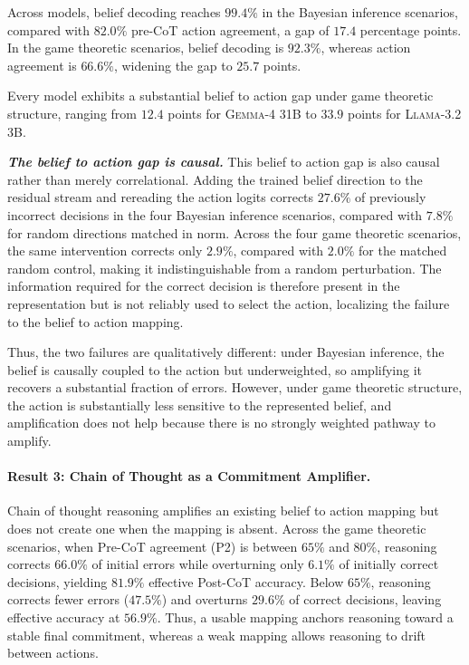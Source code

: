 \documentclass[letterpaper]{article} %
\newcommand{\model}[1]{\textsc{#1}}
\begin{document}
Across models, belief decoding reaches \(99.4\%\) in the Bayesian inference
scenarios, compared with \(82.0\%\) pre-CoT action agreement, a gap of
\(17.4\) percentage points. In the game theoretic scenarios, belief decoding
is \(92.3\%\), whereas action agreement is \(66.6\%\), widening the gap to
\(25.7\) points.

Every model exhibits a substantial belief to action gap under game
theoretic structure, ranging from \(12.4\) points for
\model{Gemma-4} 31B to \(33.9\) points for \model{Llama-3.2} 3B.



\textbf{\textit{The belief to action gap is causal.}}
This belief to action gap is also causal rather than merely
correlational. Adding the trained belief direction to the residual stream
and rereading the action logits corrects \(27.6\%\) of previously
incorrect decisions in the four Bayesian inference scenarios, compared
with \(7.8\%\) for random directions matched in norm. Across the four game
theoretic scenarios, the same intervention corrects only \(2.9\%\),
compared with \(2.0\%\) for the matched random control, making it
indistinguishable from a random perturbation. The information required for
the correct decision is therefore present in the representation but is not
reliably used to select the action, localizing the failure to the belief to
action mapping.

Thus, the two failures are qualitatively different: under
Bayesian inference, the belief is causally coupled to the action but
underweighted, so amplifying it recovers a substantial fraction of errors. However,
under game theoretic structure, the action is substantially less sensitive
to the represented belief, and amplification does not help because there
is no strongly weighted pathway to amplify.

\paragraph{Result 3: Chain of Thought as a Commitment Amplifier.}

Chain of thought reasoning amplifies an existing belief to action mapping
but does not create one when the mapping is absent. Across the game
theoretic scenarios, when Pre-CoT agreement (P2) is between \(65\%\) and
\(80\%\), reasoning corrects \(66.0\%\) of initial errors while overturning
only \(6.1\%\) of initially correct decisions, yielding \(81.9\%\)
effective Post-CoT accuracy. Below \(65\%\), reasoning corrects fewer
errors (\(47.5\%\)) and overturns \(29.6\%\) of correct decisions, leaving
effective accuracy at \(56.9\%\). Thus, a usable mapping anchors reasoning
toward a stable final commitment, whereas a weak mapping allows reasoning
to drift between actions.
\end{document}
